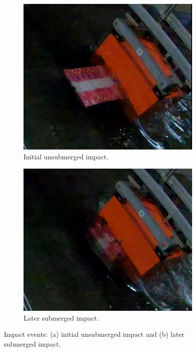 \documentclass{article}
\begin{document}
\begin{figure}[htbp]
    \centering
    \begin{subfigure}[b]{0.48\textwidth}
        \centering
        \includegraphics[width=\textwidth]{first_impact.jpg}
        \caption{Initial unsubmerged impact.}
        \label{fig:first_impact}
    \end{subfigure}
    \hfill
    \begin{subfigure}[b]{0.48\textwidth}
        \centering
        \includegraphics[width=\textwidth]{second_impact.jpg}
        \caption{Later submerged impact.}
        \label{fig:second_impact}
    \end{subfigure}
    \caption{Impact events: (a) initial unsubmerged impact and (b) later submerged impact.}
    \label{fig:impact_combined}
\end{figure}
\end{document}
